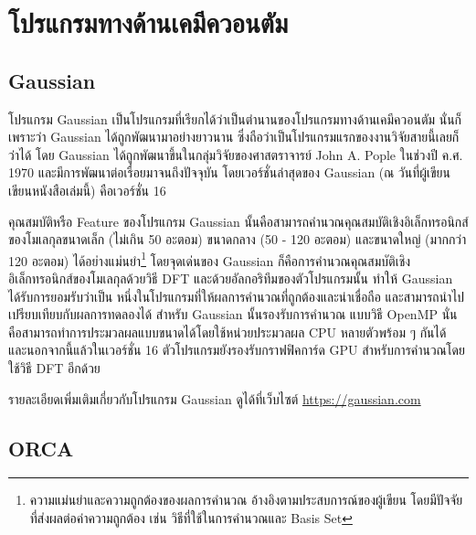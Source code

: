 

\section{โปรแกรมทางด้านเคมีควอนตัม}
\label{ap:qm_software}

\subsection{Gaussian}
\label{ssec:software_gaussian}

โปรแกรม Gaussian เป็นโปรแกรมที่เรียกได้ว่าเป็นตำนานของโปรแกรมทางด้านเคมีควอนตัม นั่นก็เพราะว่า Gaussian ได้ถูกพัฒนามาอย่างยาวนาน 
ซึ่งถือว่าเป็นโปรแกรมแรกของงานวิจัยสายนี้เลยก็ว่าได้ โดย Gaussian ได้ถูกพัฒนาขึ้นในกลุ่มวิจัยของศาสตราจารย์ John A. Pople ในช่วงปี ค.ศ.
1970 และมีการพัฒนาต่อเรื่อยมาจนถึงปัจจุบัน โดยเวอร์ชั่นล่าสุดของ Gaussian (ณ วันที่ผู้เขียนเขียนหนังสือเล่มนี้) คือเวอร์ชั่น 16\autocite{g16}

คุณสมบัติหรือ Feature ของโปรแกรม Gaussian นั้นคือสามารถคำนวณคุณสมบัติเชิงอิเล็กทรอนิกส์ของโมเลกุลขนาดเล็ก (ไม่เกิน 50 อะตอม) 
ขนาดกลาง (50 - 120 อะตอม) และขนาดใหญ่ (มากกว่า 120 อะตอม) ได้อย่างแม่นยำ\footnote{ความแม่นยำและความถูกต้องของผลการคำนวณ%
อ้างอิงตามประสบการณ์ของผู้เขียน โดยมีปัจจัยที่ส่งผลต่อค่าความถูกต้อง เช่น วิธีที่ใช้ในการคำนวณและ Basis Set} โดยจุดเด่นของ Gaussian 
ก็คือการคำนวณคุณสมบัติเชิงอิเล็กทรอนิกส์ของโมเลกุลด้วยวิธี DFT และด้วยอัลกอริทึมของตัวโปรแกรมนั้น ทำให้ Gaussian ได้รับการยอมรับว่าเป็น%
หนึ่งในโปรแกรมที่ให้ผลการคำนวณที่ถูกต้องและน่าเชื่อถือ และสามารถนำไปเปรียบเทียบกับผลการทดลองได้ สำหรับ Gaussian นั้นรองรับการคำนวณ%
แบบวิธี OpenMP นั่นคือสามารถทำการประมวลผลแบบขนาดได้โดยใช้หน่วยประมวลผล CPU หลายตัวพร้อม ๆ กันได้ และนอกจากนี้แล้วในเวอร์ชั่น 16
ตัวโปรแกรมยังรองรับกราฟฟิคการ์ด GPU สำหรับการคำนวณโดยใช้วิธี DFT อีกด้วย 

รายละเอียดเพิ่มเติมเกี่ยวกับโปรแกรม Gaussian ดูได้ที่เว็บไซต์ \url{https://gaussian.com}

\subsection{ORCA}
\label{ssec:orca}


